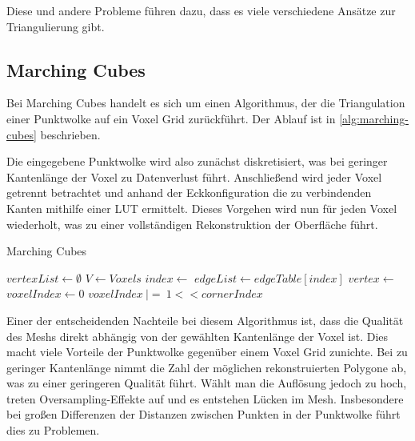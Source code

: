 Diese und andere Probleme führen dazu, dass es viele verschiedene Ansätze zur Triangulierung gibt.


\subsection{Marching Cubes}
\label{subsec:marching-cubes}

Bei Marching Cubes \cite{lorensen1987marching} handelt es sich um einen Algorithmus, der die Triangulation einer Punktwolke auf ein Voxel Grid zurückführt.
Der Ablauf ist in \autoref{alg:marching-cubes} beschrieben.

Die eingegebene Punktwolke wird also zunächst diskretisiert, was bei geringer Kantenlänge der Voxel zu Datenverlust führt.
Anschließend wird jeder Voxel getrennt betrachtet und anhand der Eckkonfiguration die zu verbindenden Kanten mithilfe einer \ac{LUT} ermittelt.
Dieses Vorgehen wird nun für jeden Voxel wiederholt, was zu einer vollständigen Rekonstruktion der Oberfläche führt.

\begin{algorithm}[ht]
\caption{Marching Cubes}
\label{alg:marching-cubes}
\begin{algorithmic}
	\State $vertexList \gets \emptyset$
	\State $V \gets Voxels$
		\State $index \gets$ 
		\State $edgeList \gets edgeTable[index]$
			\State $vertex \gets$ 
			\State {}
		\EndFor
	\EndFor
\EndFunction
{}
	\State $voxelIndex \gets 0$
			\State $voxelIndex\ |=\ 1 << cornerIndex$
		\EndIf
	\EndFor
	\State {}
\EndFunction
\end{algorithmic}
\end{algorithm}

Einer der entscheidenden Nachteile bei diesem Algorithmus ist, dass die Qualität des Meshs direkt abhängig von der gewählten Kantenlänge der Voxel ist.
Dies macht viele Vorteile der Punktwolke gegenüber einem Voxel Grid zunichte.
Bei zu geringer Kantenlänge nimmt die Zahl der möglichen rekonstruierten Polygone ab, was zu einer geringeren Qualität führt.
Wählt man die Auflösung jedoch zu hoch, treten Oversampling-Effekte auf und es entstehen Lücken im Mesh.
Insbesondere bei großen Differenzen der Distanzen zwischen Punkten in der Punktwolke führt dies zu Problemen.

